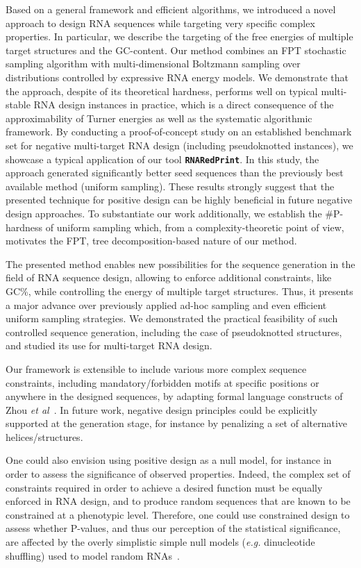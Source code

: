\documentclass[]{bmcart}
\newcommand{\Nuc}[1]{{\sf #1}}
\newcommand{\Cb}{\Nuc{C}}
\newcommand{\Gb}{\Nuc{G}}
\newcommand{\GCb}{\Gb\Cb}
\newcommand{\ourprog}{{\tt \bfseries{}\color{black!85}RNA\textcolor{red!70!black}{Red}Print}}
\newcommand{\citet}[1]{\cite{#1}}
\newcommand{\revised}[1]{{\color{red} #1}}
\begin{document}
\revised{Based on a general framework and efficient algorithms, we introduced a novel approach to design RNA
sequences while targeting very specific complex properties}. In particular, we describe the targeting of the free energies of multiple target structures and the \GCb-content.
Our method combines an FPT stochastic sampling algorithm
with multi-dimensional Boltzmann sampling over distributions
controlled by expressive RNA energy models. \revised{We demonstrate that the approach, despite of its theoretical hardness, performs well on typical multi-stable RNA design instances in practice, which is a direct consequence of the approximability of Turner energies as well as the systematic algorithmic framework. By conducting a proof-of-concept study 
  on an established benchmark set for negative multi-target RNA design (including pseudoknotted instances), we showcase a typical application of our tool \ourprog{}. In this study, 
  the approach generated significantly better seed sequences than
the previously best available method (uniform sampling). These results strongly suggest that the presented technique for positive design can be highly beneficial in future negative design approaches.
}
%
To substantiate our work additionally, we establish the $\#${\sf P}-hardness of uniform sampling which,
from a complexity-theoretic point of view, motivates the FPT, tree decomposition-based nature of our method.  

The presented method enables new possibilities for the sequence generation
in the field of RNA sequence design, allowing to enforce additional
constraints, like \GCb\%, while controlling the energy of
multiple target structures. Thus, it presents a major advance over
previously applied ad-hoc sampling and even efficient uniform sampling
strategies. We demonstrated the practical feasibility of such controlled sequence
generation, including the case of pseudoknotted structures, and studied its use for multi-target RNA design.

Our framework is extensible to include various more complex sequence constraints, including mandatory/forbidden motifs at specific
positions or anywhere in the designed sequences, by adapting formal language constructs
of Zhou \emph{et al}~\citet{Zhou2013}. In future work, negative design principles could 
be explicitly supported at the generation stage, for instance by
penalizing a set of alternative helices/structures.

One could also envision using positive design as a null model, for instance in order to assess the significance of observed properties. Indeed, the complex set of constraints required in order to achieve a desired function must be equally enforced in RNA design, and to produce random sequences that are known to be constrained at a phenotypic level. \revised{Therefore, one could} use constrained design to assess whether P-values, and \revised{thus} our perception of the statistical significance, are affected by the overly simplistic simple null models (\emph{e.g.} dinucleotide shuffling) used to model random RNAs~\cite{Rivas2017}.
\end{document}
